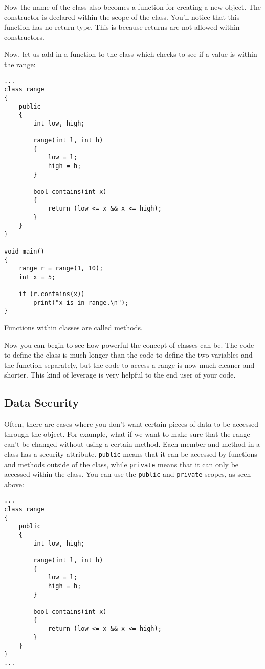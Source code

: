 \documentclass[10pt,a4paper]{article}
\begin{document}
Now the name of the class also becomes a function for creating a new object. The constructor is declared within the scope of the class. You'll notice that this function has no return type. This is because returns are not allowed within constructors.

Now, let us add in a function to the class which checks to see if a value is within the range:
\begin{verbatim}
...
class range
{
    public
    {
        int low, high;
        
        range(int l, int h)
        {
            low = l;
            high = h;
        }
        
        bool contains(int x)
        {
            return (low <= x && x <= high);
        }
    }
}

void main()
{
    range r = range(1, 10);
    int x = 5;
    
    if (r.contains(x))
        print("x is in range.\n");
}
\end{verbatim}

Functions within classes are called methods.

Now you can begin to see how powerful the concept of classes can be. The code to define the class is much longer than the code to define the two variables and the function separately, but the code to access a range is now much cleaner and shorter. This kind of leverage is very helpful to the end user of your code.

\newpage





\subsection{Data Security}
Often, there are cases where you don't want certain pieces of data to be accessed through the object. For example, what if we want to make sure that the range can't be changed without using a certain method. Each member and method in a class has a security attribute. \verb|public| means that it can be accessed by functions and methods outside of the class, while \verb|private| means that it can only be accessed within the class. You can use the \verb|public| and \verb|private| scopes, as seen above:
\begin{verbatim}
...
class range
{
    public
    {
        int low, high;
        
        range(int l, int h)
        {
            low = l;
            high = h;
        }
        
        bool contains(int x)
        {
            return (low <= x && x <= high);
        }
    }
}
...
\end{verbatim}
\end{document}
